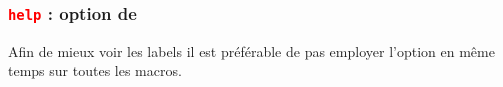 \subsubsection{\texttt{\textcolor{red}{help}} :  option de }
Afin de mieux voir les labels il est préférable de pas employer l'option  en même temps sur toutes les macros. 
%
%
%
%
